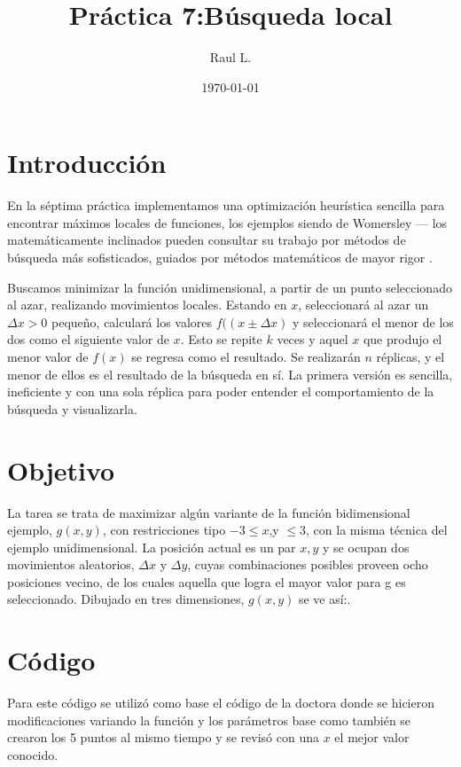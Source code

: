 \documentclass{article}
\author{Raul L.} %
\title{Pr\'{a}ctica 7:Búsqueda local} %
\date{\today}
\begin{document}

\maketitle %


\section{Introducci\'{o}n}\label{intro} %
En la séptima práctica implementamos una optimización heurística sencilla para encontrar máximos locales de funciones, los ejemplos siendo de Womersley \citep{1} — los matemáticamente inclinados pueden consultar su trabajo por métodos de búsqueda más sofisticados, guiados por métodos matemáticos de mayor rigor \citep{2}.
\newline



Buscamos minimizar la función unidimensional, a partir de un punto seleccionado al azar, realizando movimientos locales. Estando en $x$, seleccionará al azar un $\varDelta x>0$ pequeño, calculará los valores $f( (x \pm \varDelta x)$ y seleccionará el menor de los dos como el siguiente valor de $x$. Esto se repite $k$ veces y aquel $x$ que produjo el menor valor de $f(x)$ se regresa como el resultado. Se realizarán $n$ réplicas, y el menor de ellos es el resultado de la búsqueda en sí. La primera versión es sencilla, ineficiente y con una sola réplica para poder entender el comportamiento de la búsqueda y visualizarla.

\section{Objetivo}
La tarea se trata de maximizar algún variante de la función bidimensional ejemplo, $g(x,y)$, con restricciones tipo $ - 3 \leq x $,y $ \leq 3 $, con la misma técnica del ejemplo unidimensional. La posición actual es un par $x,y$ y se ocupan dos movimientos aleatorios, $ \varDelta x$  y $\varDelta y $, cuyas combinaciones posibles proveen ocho posiciones vecino, de los cuales aquella que logra el mayor valor para g es seleccionado. Dibujado en tres dimensiones, $g(x,y)$ se ve así:\citep{2}.

\section{C\'{o}digo}
Para este código se utilizó como base el código de la doctora donde se hicieron modificaciones variando la función y los parámetros base como también se crearon los 5 puntos al mismo tiempo y se revisó con una $x$ el mejor valor conocido.
\end{document}
